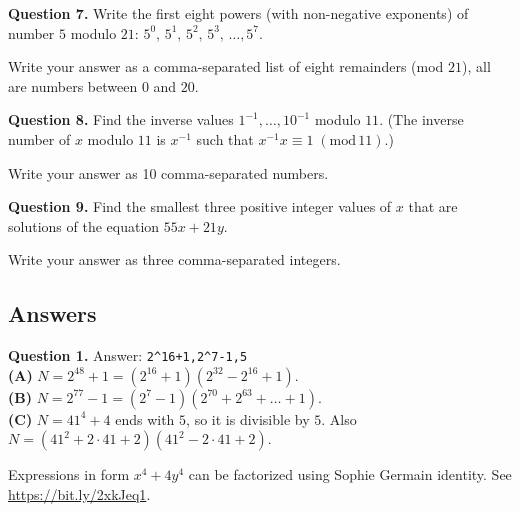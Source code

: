 \documentclass[jou]{apa6}
\begin{document}
\vspace{10pt}
{\bf Question 7.} Write the first eight powers (with non-negative exponents) 
of number $5$ modulo $21$: $5^0,\,5^1,\,5^2,\,5^3,\,\ldots,5^{7}$.

Write your answer as a comma-separated list of eight remainders (mod $21$), \textendash{} all are numbers between $0$ and $20$.


\vspace{10pt}
{\bf Question 8.} Find the inverse values $1^{-1},\ldots,10^{-1}$ modulo $11$. (The inverse number of $x$ modulo $11$ 
is $x^{-1}$ such that $x^{-1}x \equiv 1\;(\text{mod}\,11)$.)

Write your answer as 10 comma-separated numbers.


\vspace{10pt}
{\bf Question 9.} Find the smallest three positive integer values of $x$ that
are solutions of the equation $55x + 21y$. 

Write your answer as three comma-separated integers. 


\newpage 
\subsection{Answers}

\vspace{6pt}
{\bf Question 1.} Answer: {\tt 2\^{}16+1,2\^{}7-1,5}\\

{\bf (A)} $N = 2^{48} + 1 = \left( 2^{16} + 1 \right) \left( 2^{32} - 2^{16} + 1 \right)$.\\
{\bf (B)} $N = 2^{77} - 1 = \left( 2^{7} - 1 \right) \left( 2^{70} + 2^{63} + \ldots + 1 \right)$.\\
{\bf (C)} $N = 41^4 + 4$ ends with $5$, so it is divisible by $5$. 
Also $N = \left( 41^2 + 2 \cdot 41 + 2 \right) \left( 41^2 - 2 \cdot 41 + 2 \right)$. 

Expressions in form $x^4 + 4y^4$ can be factorized using Sophie Germain identity. 
See \url{https://bit.ly/2xkJeq1}.
\end{document}
